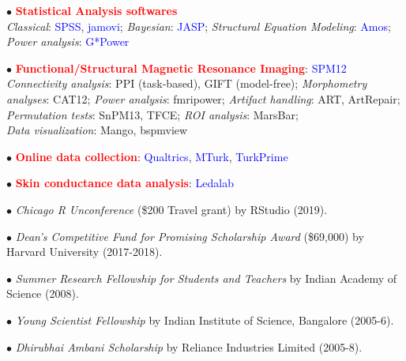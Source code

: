 \documentclass[10pt]{article}
\begin{document}
	$\bullet$ \textcolor{red}{\textbf{Statistical Analysis softwares}}\\
	\hspace*{0.1in}\textit{Classical}: \textcolor{blue}{SPSS}, \textcolor{blue}{jamovi}; \textit{Bayesian}: \textcolor{blue}{JASP}; \textit{Structural Equation Modeling}: \textcolor{blue}{Amos}; \textit{Power analysis}: \textcolor{blue}{G*Power}
	\miniskip
	
	$\bullet$ \textcolor{red}{\textbf{Functional/Structural Magnetic Resonance Imaging}}: \textcolor{blue}{SPM12}\\
	\hspace*{0.1in}\textit{Connectivity analysis}: PPI (task-based), GIFT (model-free); \textit{Morphometry analyses}: CAT12; \textit{Power analysis}: \hspace*{0.1in}fmripower; \textit{Artifact handling}: ART, ArtRepair; \textit{Permutation tests}: SnPM13, TFCE; \textit{ROI analysis}: MarsBar;\\ 
	\hspace*{0.1in}\textit{Data visualization}: Mango, bspmview
	\miniskip
	
	$\bullet$ \textcolor{red}{\textbf{Online data collection}}: \textcolor{blue}{Qualtrics}, \textcolor{blue}{MTurk}, \textcolor{blue}{TurkPrime}\\
	\miniskip
	
	$\bullet$ \textcolor{red}{\textbf{Skin conductance data analysis}}: \textcolor{blue}{Ledalab}

	
	$\bullet$ \textit{Chicago R Unconference} (\$200 Travel grant) by RStudio (2019).\\
	\miniskip		
	
	$\bullet$ \textit{Dean's Competitive Fund for Promising Scholarship Award} (\$69,000) by Harvard University (2017-2018).\\
	\miniskip	
	
	$\bullet$ {\it Summer Research Fellowship for Students and Teachers} by Indian Academy of Science (2008).\\
	\miniskip
	
	$\bullet$ {\it Young Scientist Fellowship} by Indian Institute of Science, Bangalore (2005-6).\\
	\miniskip
	
	$\bullet$ {\it Dhirubhai Ambani Scholarship} by Reliance Industries Limited (2005-8). 	
	
	
\end{document}
